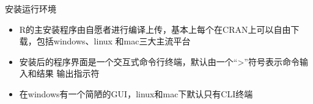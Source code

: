 \documentclass{beamerthemeMono}
\begin{document}
\begin{frame}[t]{\subsecname}{安装运行环境}
\begin{itemize}
\item R的主安装程序由自愿者进行编译上传，基本上每个在CRAN上可以自由下载，包括windows、linux
                 和mac三大主流平台
\item 安装后的程序界面是一个交互式命令行终端，默认由一个“>”符号表示命令输入和结果
                 输出指示符
\item 在windows有一个简陋的GUI，linux和mac下默认只有CLI终端 
\end{itemize} 

\begin{overlayarea}{\textwidth}{\textheight}


\end{overlayarea}
\end{frame}
\end{document}
